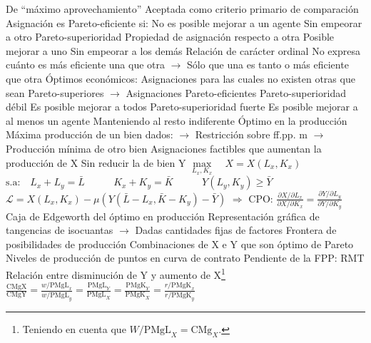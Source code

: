 \documentclass{nuevotema}
\begin{document}
\begin{esquemal}
				\4[] De ``máximo aprovechamiento''
				\4[] Aceptada como criterio primario de comparación
				\4 Asignación es Pareto-eficiente si:
				\4[] No es posible mejorar a un agente
				\4[] Sin empeorar a otro
				\4 Pareto-superioridad
				\4[] Propiedad de asignación respecto a otra
				\4[] Posible mejorar a uno
				\4[] Sin empeorar a los demás
				\4 Relación de carácter ordinal
				\4[] No expresa cuánto es más eficiente una que otra
				\4[] $\to$ Sólo que una es tanto o más eficiente que otra
				\4 Óptimos económicos:
				\4[] Asignaciones para las cuales
				\4[] no existen otras que sean Pareto-superiores
				\4[] $\to$ Asignaciones Pareto-eficientes
				\4 Pareto-superioridad débil
				\4[] Es posible mejorar a todos
				\4 Pareto-superioridad fuerte
				\4[] Es posible mejorar a al menos un agente
				\4[] Manteniendo al resto indiferente
			\3 Óptimo en la producción
				\4 Máxima producción de un bien dados:
				\4[] $\to$ Restricción sobre ff.pp. m
				\4[] $\to$ Producción mínima de otro bien
				\4[$\Rightarrow$] Asignaciones factibles que aumentan la producción de X
				\4[] Sin reducir la de bien Y
				\4[] $\underset{L_x, K_x}{\max} \quad X = X(L_x, K_x) $
				\4[] $\text{s.a:} \quad L_x + L_y = \bar{L}$
				\4[] $\quad \quad \; \; K_x + K_y = \bar{K}$
				\4[] $\quad \quad \; \; Y(L_y, K_y) \geq \bar{Y}$
				\4[] $\mathcal{L} = X(L_x,K_x) - \mu \left( Y(\bar{L} - L_x, \bar{K} - K_y) - \bar{Y}  \right)$
				\4[] $\Rightarrow$ CPO: $\frac{\partial X / \partial L_x}{\partial X / \partial K_x} = \frac{\partial Y / \partial L_y}{\partial Y / \partial K_y}$
				\4[] 
				\4 Caja de Edgeworth del óptimo en producción
				\4[] Representación gráfica de tangencias de isocuantas
				\4[] $\to$ Dadas cantidades fijas de factores
				\4[] 
				\4 Frontera de posibilidades de producción
				\4[] Combinaciones de X e Y que son óptimo de Pareto
				\4[] Niveles de producción de puntos en curva de contrato
				\4[] 
				\4 Pendiente de la FPP: RMT
				\4[] Relación entre disminución de Y y aumento de X\footnote{Teniendo en cuenta que $W/\text{PMgL}_X = \text{CMg}_X$.}
				\4[] 
				\4[] $\frac{\text{CMgX}}{\text{CMgY}} = \frac{w/\text{PMgL}_x}{w/\text{PMgL}_y} = \frac{\text{PMgL}_Y}{\text{PMgL}_X} =  \frac{\text{PMgK}_Y}{\text{PMgK}_X} = \frac{r/\text{PMgK}_x}{r/\text{PMgK}_y}$

\end{esquemal}
\end{document}
